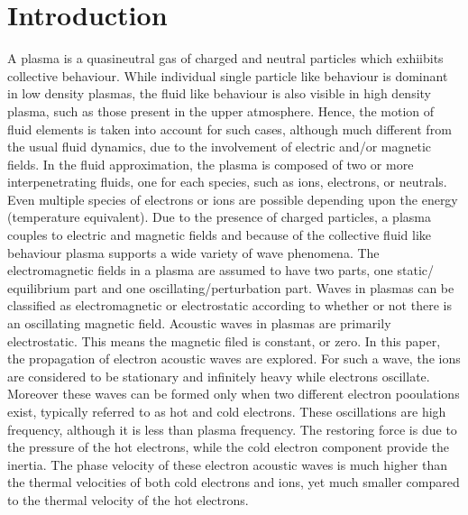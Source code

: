 \documentclass[a4paper, 12pt]{article}
\begin{document}
\section{Introduction} %
A plasma is a quasineutral gas of charged and neutral particles which exhiibits collective behaviour. While individual single particle like behaviour is dominant in low density plasmas, the fluid like behaviour is also visible in high density plasma, such as those present in the upper atmosphere. Hence, the motion of fluid elements is taken into account for such cases, although much different from the usual fluid dynamics, due to the involvement of electric and/or magnetic fields. In the fluid approximation, the plasma is composed of two or more
interpenetrating fluids, one for each species, such as ions, electrons, or neutrals. Even multiple species of electrons or ions are possible depending upon the energy (temperature equivalent). Due to the presence of charged particles, a plasma couples to electric and magnetic fields and because of the collective fluid like behaviour plasma supports a wide variety of wave phenomena.
\newline %
The electromagnetic fields in a plasma are assumed to have two parts, one static/ equilibrium part and one oscillating/perturbation part. Waves in plasmas can be classified as electromagnetic or electrostatic according to whether or not there is an oscillating magnetic field. Acoustic waves in plasmas are primarily electrostatic. This means the magnetic filed is constant, or zero. In this paper, the propagation of electron acoustic waves are explored. For such a wave, the ions are considered to be stationary and infinitely heavy while electrons oscillate.  Moreover these waves can be formed only when two different electron pooulations exist, typically referred to as hot and cold electrons. These oscillations are high frequency, although it is less than plasma frequency. The restoring force is due to the pressure of the hot electrons, while the cold electron component provide the inertia. The phase velocity of these electron acoustic waves is much higher than the thermal velocities of both cold electrons and ions, yet much smaller compared to the thermal velocity of the hot electrons.\cite{akter}
\newline
\end{document}
